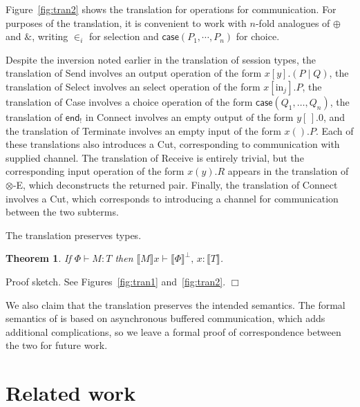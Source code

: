 \documentclass{jfp1}
\newcommand{\typecolor}{}
\newcommand{\tp}[1]{{\typecolor #1}}
\newcommand{\bvdash}{\tp{{} \vdash {}}}
\newcommand{\with}{\mathbin{\binampersand}}
\newcommand{\comma}{,\,}
\newcommand{\case}{\key{case}}
\newcommand{\key}{\textsf}
\newcommand{\sem}[1]{\llbracket #1 \rrbracket}
\newtheorem{theorem}{Theorem}
\begin{document}
Figure~\ref{fig:tran2} shows
the translation for operations for communication.
For purposes of the translation, it is convenient to work
with $n$-fold analogues of $\oplus$ and $\with$,
writing $\in_i$ for selection and $\case(P_1,\cdots,P_n)$ for choice.

Despite the inversion noted earlier in the translation of session
types, the translation of Send involves an output operation of the
form $x[y].(P \mid Q)$, the translation of Select involves an select
operation of the form $x[\mathrm{in}_j].P$, the translation of Case involves a
choice operation of the form $\case(Q_1,\ldots,Q_n)$, the translation
of $\key{end}_!$ in Connect involves an empty output of the form
$y[\,].0$, and the translation of Terminate involves an empty input of
the form $x().P$.  Each of these translations also introduces a Cut,
corresponding to communication with supplied channel.  The translation
of Receive is entirely trivial, but the corresponding input operation
of the form $x(y).R$ appears in the translation of $\otimes$-E, which
deconstructs the returned pair.  Finally, the translation of Connect
involves a Cut, which corresponds to introducing a channel for
communication between the two subterms.

The translation preserves types.
\begin{theorem}
If $\Phi \bvdash M : T$ then $\sem{M}x \bvdash \sem{\Phi}^\bot \comma x : \sem{T}$.
\end{theorem}
Proof sketch.  See Figures~\ref{fig:tran1} and~\ref{fig:tran2}. $\Box$



We also claim that the translation preserves the intended semantics.
The formal semantics of \citet{GayVasconcelos10} is based on
asynchronous buffered communication, which adds additional
complications, so we leave a formal proof of
correspondence between the two for future work.


\section{Related work}
\label{sec:related}
\end{document}
